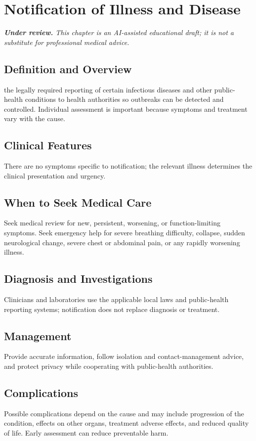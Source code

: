 \chapter{Notification of Illness and Disease}

\medskip
\noindent\textit{\textbf{Under review.} This chapter is an AI-assisted educational draft; it is not a substitute for professional medical advice.}

\section*{Definition and Overview}
the legally required reporting of certain infectious diseases and other public-health conditions to health authorities so outbreaks can be detected and controlled. Individual assessment is important because symptoms and treatment vary with the cause.

\section*{Clinical Features}
There are no symptoms specific to notification; the relevant illness determines the clinical presentation and urgency.

\section*{When to Seek Medical Care}
Seek medical review for new, persistent, worsening, or function-limiting symptoms. Seek emergency help for severe breathing difficulty, collapse, sudden neurological change, severe chest or abdominal pain, or any rapidly worsening illness.

\section*{Diagnosis and Investigations}
Clinicians and laboratories use the applicable local laws and public-health reporting systems; notification does not replace diagnosis or treatment.

\section*{Management}
Provide accurate information, follow isolation and contact-management advice, and protect privacy while cooperating with public-health authorities.

\section*{Complications}
Possible complications depend on the cause and may include progression of the condition, effects on other organs, treatment adverse effects, and reduced quality of life. Early assessment can reduce preventable harm.

